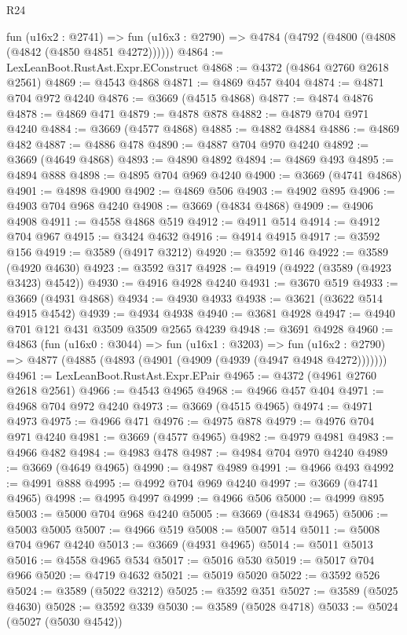 \begin{lexlean}{R24}
\begin{coremodule}
    fun (u16x2 : @2741) =>
    fun (u16x3 : @2790) => @4784 (@4792 (@4800 (@4808 (@4842 (@4850 @4851 @4272))))))
@4864 := LexLeanBoot.RustAst.Expr.EConstruct
@4868 := @4372 (@4864 @2760 @2618 @2561)
@4869 := @4543 @4868
@4871 := @4869 @457 @404
@4874 := @4871 @704 @972 @4240
@4876 := @3669 (@4515 @4868)
@4877 := @4874 @4876
@4878 := @4869 @471
@4879 := @4878 @878
@4882 := @4879 @704 @971 @4240
@4884 := @3669 (@4577 @4868)
@4885 := @4882 @4884
@4886 := @4869 @482
@4887 := @4886 @478
@4890 := @4887 @704 @970 @4240
@4892 := @3669 (@4649 @4868)
@4893 := @4890 @4892
@4894 := @4869 @493
@4895 := @4894 @888
@4898 := @4895 @704 @969 @4240
@4900 := @3669 (@4741 @4868)
@4901 := @4898 @4900
@4902 := @4869 @506
@4903 := @4902 @895
@4906 := @4903 @704 @968 @4240
@4908 := @3669 (@4834 @4868)
@4909 := @4906 @4908
@4911 := @4558 @4868 @519
@4912 := @4911 @514
@4914 := @4912 @704 @967
@4915 := @3424 @4632
@4916 := @4914 @4915
@4917 := @3592 @156
@4919 := @3589 (@4917 @3212)
@4920 := @3592 @146
@4922 := @3589 (@4920 @4630)
@4923 := @3592 @317
@4928 := @4919 (@4922 (@3589 (@4923 @3423) @4542))
@4930 := @4916 @4928 @4240
@4931 := @3670 @519
@4933 := @3669 (@4931 @4868)
@4934 := @4930 @4933
@4938 := @3621 (@3622 @514 @4915 @4542)
@4939 := @4934 @4938
@4940 := @3681 @4928
@4947 := @4940 @701 @121 @431 @3509 @3509 @2565 @4239
@4948 := @3691 @4928
@4960 := @4863
    (fun (u16x0 : @3044) =>
    fun (u16x1 : @3203) =>
    fun (u16x2 : @2790) => @4877 (@4885 (@4893 (@4901 (@4909 (@4939 (@4947 @4948 @4272)))))))
@4961 := LexLeanBoot.RustAst.Expr.EPair
@4965 := @4372 (@4961 @2760 @2618 @2561)
@4966 := @4543 @4965
@4968 := @4966 @457 @404
@4971 := @4968 @704 @972 @4240
@4973 := @3669 (@4515 @4965)
@4974 := @4971 @4973
@4975 := @4966 @471
@4976 := @4975 @878
@4979 := @4976 @704 @971 @4240
@4981 := @3669 (@4577 @4965)
@4982 := @4979 @4981
@4983 := @4966 @482
@4984 := @4983 @478
@4987 := @4984 @704 @970 @4240
@4989 := @3669 (@4649 @4965)
@4990 := @4987 @4989
@4991 := @4966 @493
@4992 := @4991 @888
@4995 := @4992 @704 @969 @4240
@4997 := @3669 (@4741 @4965)
@4998 := @4995 @4997
@4999 := @4966 @506
@5000 := @4999 @895
@5003 := @5000 @704 @968 @4240
@5005 := @3669 (@4834 @4965)
@5006 := @5003 @5005
@5007 := @4966 @519
@5008 := @5007 @514
@5011 := @5008 @704 @967 @4240
@5013 := @3669 (@4931 @4965)
@5014 := @5011 @5013
@5016 := @4558 @4965 @534
@5017 := @5016 @530
@5019 := @5017 @704 @966
@5020 := @4719 @4632
@5021 := @5019 @5020
@5022 := @3592 @526
@5024 := @3589 (@5022 @3212)
@5025 := @3592 @351
@5027 := @3589 (@5025 @4630)
@5028 := @3592 @339
@5030 := @3589 (@5028 @4718)
@5033 := @5024 (@5027 (@5030 @4542))

\end{coremodule}
\end{lexlean}
